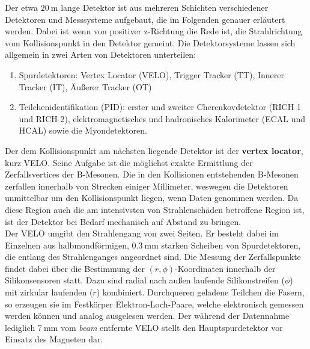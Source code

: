 %
Der etwa $\SI{20}{\meter}$ lange Detektor ist aus mehreren Schichten verschiedener Detektoren und Messsysteme aufgebaut, die im Folgenden genauer erläutert werden. Dabei ist wenn von positiver z-Richtung die Rede ist, die Strahlrichtung vom Kollisionspunkt in den Detektor gemeint. Die Detektorsysteme lassen sich allgemein in zwei Arten von Detektoren unterteilen:
%
\begin{enumerate}
  \item Spurdetektoren: Vertex Locator (VELO), Trigger Tracker (TT), Innerer Tracker (IT), Äußerer Tracker (OT)
  \item Teilchenidentifikation (PID): erster und zweiter Cherenkovdetektor (RICH 1 und RICH 2), elektromagnetisches und hadronisches Kalorimeter (ECAL und HCAL) sowie die Myondetektoren.
\end{enumerate}
%
Der dem Kollisionspunkt am nächsten liegende Detektor ist der \textbf{vertex locator}, kurz VELO. Seine Aufgabe ist die möglichst exakte Ermittlung der Zerfallsvertices der B-Mesonen. Die in den Kollisionen entstehenden B-Mesonen zerfallen innerhalb von Strecken einiger Millimeter, weswegen die Detektoren unmittelbar um den Kollisionspunkt liegen, wenn Daten genommen werden\cite{velo}. Da diese Region auch die am intensivsten von Strahlenschäden betroffene Region ist, ist der Detektor bei Bedarf mechanisch auf Abstand zu bringen.\\
Der VELO umgibt den Strahlengang von zwei Seiten. Er besteht dabei im Einzelnen aus halbmondförmigen, $\SI{0.3}{\milli\meter}$ starken Scheiben von Spurdetektoren, die entlang des Strahlenganges angeordnet sind\cite{velo}. Die Messung der Zerfallspunkte findet dabei über die Bestimmung der $(r, \phi)$-Koordinaten innerhalb der Silikonsensoren statt. Dazu sind radial nach außen laufende Silikonstreifen ($\phi$) mit zirkular laufenden ($r$) kombiniert\cite{lhcb}. Durchqueren geladene Teilchen die Fasern, so erzeugen sie im Festkörper Elektron-Loch-Paare, welche elektronisch gemessen werden können und analog ausgelesen werden. Der während der Datennahme lediglich $\SI{7}{\milli\meter}$ vom \textit{beam} entfernte VELO stellt den Hauptspurdetektor vor Einsatz des Magneten dar\cite{velo}. \\

